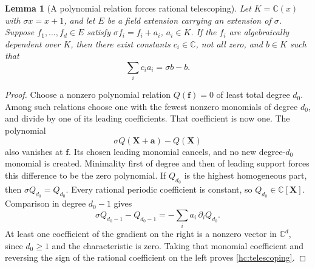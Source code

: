 \documentclass[11pt]{article}
\numberwithin{equation}{section}
\newtheorem{lemma}[theorem]{Lemma}
\theoremstyle{definition}
\theoremstyle{remark}
\begin{document}
\begin{lemma}[A polynomial relation forces rational telescoping]
\label{hc:additive}
Let $K=\mathbb C(x)$ with $\sigma x=x+1$, and let $E$ be a field
extension carrying an extension of $\sigma$. Suppose
$f_1,\ldots,f_d\in E$ satisfy $\sigma f_i=f_i+a_i$, $a_i\in K$.
If the $f_i$ are algebraically dependent over $K$, then there exist
constants $c_i\in\mathbb C$, not all zero, and $b\in K$ such that
\begin{equation}\label{hc:telescoping}
                       \sum_i c_i a_i=\sigma b-b.
\end{equation}
\end{lemma}
\begin{proof}
Choose a nonzero polynomial relation $Q(\mathbf f)=0$ of least
total degree $d_0$. Among such relations choose one with the fewest
nonzero monomials of degree $d_0$, and divide by one of its leading
coefficients. That coefficient is now one. The polynomial
\[
              \sigma Q(\mathbf X+\mathbf a)-Q(\mathbf X)
\]
also vanishes at $\mathbf f$. Its chosen leading monomial cancels,
and no new degree-$d_0$ monomial is created. Minimality first of
degree and then of leading support forces this difference to be
the zero polynomial. If $Q_{d_0}$ is the highest homogeneous part,
then $\sigma Q_{d_0}=Q_{d_0}$. Every rational periodic coefficient
is constant, so $Q_{d_0}\in\mathbb C[\mathbf X]$.
Comparison in degree $d_0-1$ gives
\[
 \sigma Q_{d_0-1}-Q_{d_0-1}
              =-\sum_i a_i\,\partial_i Q_{d_0}.
\]
At least one coefficient of the gradient on the right is a
nonzero vector in $\mathbb C^d$, since $d_0\ge1$ and the
characteristic is zero. Taking that monomial coefficient and
reversing the sign of the rational coefficient on the left proves
\eqref{hc:telescoping}.
\end{proof}
\end{document}
